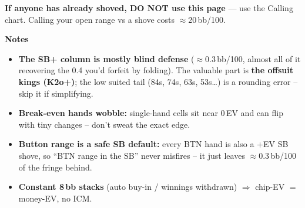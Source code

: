 \documentclass[11pt]{article}
\begin{document}
\noindent\textbf{If anyone has already shoved, DO NOT use this page} --- use the Calling chart.
Calling your open range vs a shove costs $\approx$20\,bb/100.
\par\vspace{6pt}
\noindent\textbf{\large Notes}\par\nobreak\vspace{2pt}
\begin{itemize}
\item \textbf{The SB+ column is mostly blind defense} ($\approx$0.3\,bb/100, almost all of it recovering the 0.4 you'd forfeit by folding). The valuable part is \textbf{the offsuit kings (K2o+)}; the low suited tail (84s, 74s, 63s, 53s\dots) is a rounding error -- skip it if simplifying.
\item \textbf{Break-even hands wobble:} single-hand cells sit near 0\,EV and can flip with tiny changes -- don't sweat the exact edge.
\item \textbf{Button range is a safe SB default:} every BTN hand is also a +EV SB shove, so ``BTN range in the SB'' never misfires -- it just leaves $\approx$0.3\,bb/100 of the fringe behind.
\item \textbf{Constant 8\,bb stacks} (auto buy-in / winnings withdrawn) $\Rightarrow$ chip-EV $=$ money-EV, no ICM.
\end{itemize}
\end{document}
